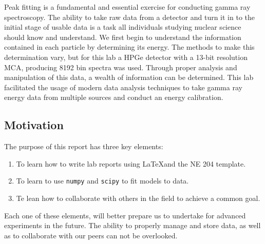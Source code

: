 Peak fitting is a fundamental and essential exercise for conducting gamma ray spectroscopy.
The ability to take raw data from a detector and turn it in to the initial stage of usable
data is a task all individuals studying nuclear science should know and understand. We first begin to
understand the information contained in each particle by determining its energy.  The methods to make this
determination vary, but for this lab a HPGe detector with a 13-bit resolution MCA, producing 8192 bin spectra was used.
Through proper analysis and manipulation of this data, a wealth of information can be determined.
This lab facilitated the usage of modern data analysis techniques to take gamma ray energy data from
multiple sources and conduct an energy calibration.

\subsection*{Motivation}
\label{sec:motivation}

The purpose of this report has three key elements:

\begin{enumerate}
  \item To learn how to write lab reports using \LaTeX and the NE 204 template.
  \item To learn to use {\tt numpy} and {\tt scipy} to fit models to data.
  \item Te lean how to collaborate with others in the field to achieve a common goal.
\end{enumerate}

Each one of these elements, will better prepare us to undertake for advanced experiments in the future.
The ability to properly manage and store data, as well as to collaborate with our peers can not be overlooked.
